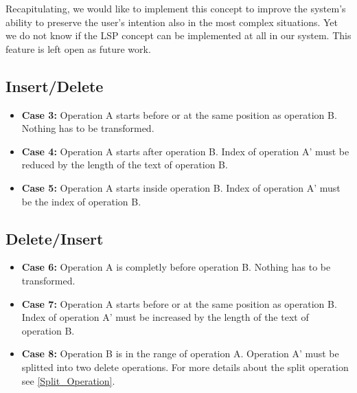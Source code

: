 \begin{itemize}
Recapitulating, we would like to implement this concept to improve the system's ability to preserve the user's intention also in the most complex situations. Yet we do not know if the LSP concept can be implemented at all in our system. This feature is left open as future  work.
\end{itemize}

\subsection{Insert/Delete}
\begin{itemize}
\item \textbf{Case 3:}
Operation A starts before or at the same position as operation B. Nothing has to be transformed.
\item \textbf{Case 4:}
Operation A starts after operation B. Index of operation A' must be reduced by the length of the text of operation B.
\item \textbf{Case 5:}
Operation A starts inside operation B. Index of operation A' must be the index of operation B.
\end{itemize}

\subsection{Delete/Insert}
\label{Delete_Insert}
\begin{itemize}
\item \textbf{Case 6:}
Operation A is completly before operation B. Nothing has to be transformed.
\item \textbf{Case 7:}
Operation A starts before or at the same position as operation B. Index of operation A' must be increased by the length of the text of operation B.
\item \textbf{Case 8:}
Operation B is in the range of operation A. Operation A' must be splitted into two delete operations. For more details about the split operation see \ref{Split_Operation}.
\end{itemize}

